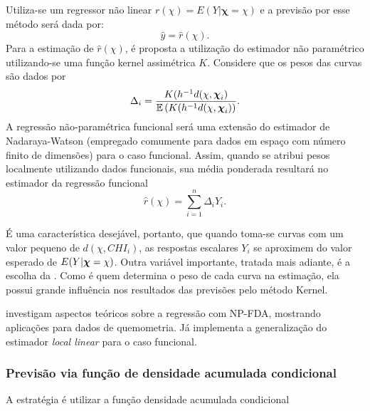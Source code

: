 \documentclass[
	12pt,				%
	openright,			%
	oneside,			%
	a4paper,			%
	english,			%
	brazil				%
	]{dissertacao-ufrgs-abntex2}
\begin{document}
Utiliza-se um regressor não linear $r(\chi)=E(Y|\boldsymbol{\chi}=\chi)$
e a previsão por esse método será dada por:
\[
\hat{y}=\hat{r}(\chi).
\]
Para a estimação de $\hat{r}(\chi)$, é proposta a utilização do estimador
não paramétrico utilizando-se uma função kernel assimétrica $K$. Considere que os pesos das curvas são dados por
\begin{equation} \label{peso-local}
\Delta_i=\frac{K(h^{-1}d(\chi,\boldsymbol{\chi}_{i})}{\mathbb{E} \left( K(h^{-1}d(\chi,\boldsymbol{\chi}_{i}) \right)}.
\end{equation}
A regressão não-paramétrica funcional será uma extensão do estimador de Nadaraya-Watson (empregado comumente para dados em espaço com número finito de dimensões) para o caso funcional. 
Assim, quando se atribui pesos localmente utilizando dados funcionais, sua média ponderada resultará no estimador da regressão funcional
\begin{equation}
	\hat{r}(\chi) = \sum_{i=1}^n \Delta_i Y_i.
\end{equation}

É uma característica desejável, portanto, que quando toma-se curvas com um valor pequeno de $d(\chi,CHI_i)$, as respostas escalares $Y_i$ se aproximem do valor esperado de $E(Y|\boldsymbol{\chi} = \chi)$. Outra variável importante, tratada mais adiante, é a escolha da \bw. Como é \bw quem determina o peso de cada curva na estimação, ela possui grande influência nos resultados das previsões pelo método Kernel.

 investigam aspectos teóricos sobre a regressão com NP-FDA, mostrando aplicações para dados de quemometria. Já  implementa a generalização do estimador \emph{local linear} para o caso funcional.


\subsubsection*{Previsão via função de densidade acumulada condicional}

A estratégia é utilizar a função densidade acumulada condicional
\end{document}
